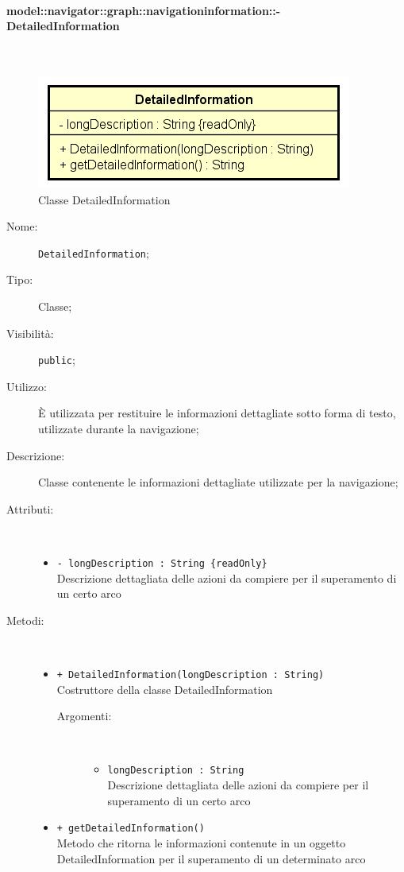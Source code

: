 \documentclass[../DefinizioneDiProdotto.tex]{subfiles}
\begin{document}
\paragraph{model::navigator::graph::navigationinformation::-\\DetailedInformation}
\
\begin{figure}[H]
	\centering
	\includegraphics[width=\maxwidth]{img/DetailedInformation.png}
	\caption{Classe DetailedInformation}\label{fig:model::navigator::graph::navigationinformation::DetailedInformation} 
\end{figure}
\begin{description}
	\item[Nome:] \texttt{DetailedInformation};
	\item[Tipo:] Classe;
	\item[Visibilità:] \texttt{public};
	\item[Utilizzo:] È utilizzata per restituire le informazioni dettagliate sotto forma di testo, utilizzate durante la navigazione;
	\item[Descrizione:] Classe contenente le informazioni dettagliate utilizzate per la navigazione;
	\item[Attributi:] \
	\begin{itemize}
		\item \texttt{- longDescription : String \{readOnly\}}\\
		Descrizione dettagliata delle azioni da compiere per il superamento di un certo arco
		
	\end{itemize}
	\item[Metodi:] \
	\begin{itemize}
		\item \texttt{+ DetailedInformation(longDescription : String)}\\
		Costruttore della classe DetailedInformation
		\begin{description}
			\item[Argomenti:] \
			\begin{itemize}
				\item \texttt{longDescription : String}\\
				Descrizione dettagliata delle azioni da compiere per il superamento di un certo arco\end{itemize}
		\end{description}
		\item \texttt{+ getDetailedInformation()}\\
		Metodo che ritorna le informazioni contenute in un oggetto DetailedInformation per il superamento di un determinato arco
	\end{itemize}
\end{description}
\end{document}
